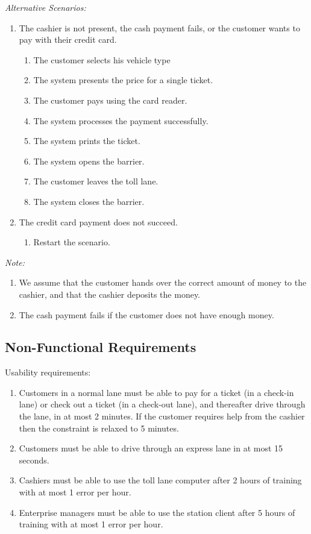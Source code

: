 \textit{Alternative Scenarios: }
\begin{enumerate}
	\item The cashier is not present, the cash payment fails, or the customer wants to pay with their credit card.
		\begin{enumerate}
			\item The customer selects his vehicle type
			\item The system presents the price for a single ticket.
			\item The customer pays using the card reader.
			\item The system processes the payment successfully.
			\item The system prints the ticket.
			\item The system opens the barrier.
			\item The customer leaves the toll lane.
			\item The system closes the barrier.
		\end{enumerate}
		
	\item The credit card payment does not succeed. 
		\begin{enumerate}
			\item Restart the scenario.
		\end{enumerate}

 \end{enumerate} 
 
 \textit{Note:} 
 \begin{enumerate}
 \item We assume that the customer hands over the correct amount of money to the cashier, and that the cashier deposits the money.
 \item The cash payment fails if the customer does not have enough money.
 \end{enumerate}


\subsection{Non-Functional Requirements}
Usability requirements:
\begin{enumerate}
\item Customers in a normal lane must be able to pay for a ticket (in a check-in lane) or check out a ticket (in a check-out lane), and thereafter drive through the lane, in at most 2 minutes. If the customer requires help from the cashier then the constraint is relaxed to 5 minutes.
\item Customers must be able to drive through an express lane in at most 15 seconds.
\item Cashiers must be able to use the toll lane computer after 2 hours of training with at most 1 error per hour.
\item Enterprise managers must be able to use the station client after 5 hours of training with at most 1 error per hour.
\end{enumerate}


